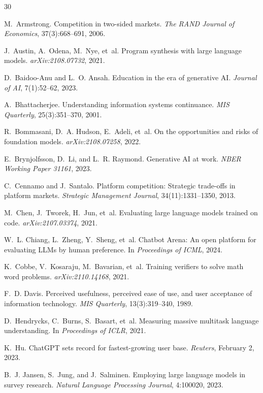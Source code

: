 \documentclass[10pt,twocolumn]{article}
\begin{document}


\begin{thebibliography}{30}
\small

 M.~Armstrong. Competition in two-sided markets. {\em The RAND Journal of Economics}, 37(3):668--691, 2006.

 J.~Austin, A.~Odena, M.~Nye, et~al. Program synthesis with large language models. {\em arXiv:2108.07732}, 2021.

 D.~Baidoo-Anu and L.~O. Ansah. Education in the era of generative {AI}. {\em Journal of AI}, 7(1):52--62, 2023.

 A.~Bhattacherjee. Understanding information systems continuance. {\em MIS Quarterly}, 25(3):351--370, 2001.

 R.~Bommasani, D.~A. Hudson, E.~Adeli, et~al. On the opportunities and risks of foundation models. {\em arXiv:2108.07258}, 2022.

 E.~Brynjolfsson, D.~Li, and L.~R. Raymond. Generative {AI} at work. {\em NBER Working Paper 31161}, 2023.

 C.~Cennamo and J.~Santalo. Platform competition: Strategic trade-offs in platform markets. {\em Strategic Management Journal}, 34(11):1331--1350, 2013.

 M.~Chen, J.~Tworek, H.~Jun, et~al. Evaluating large language models trained on code. {\em arXiv:2107.03374}, 2021.

 W.~L. Chiang, L.~Zheng, Y.~Sheng, et~al. Chatbot {A}rena: An open platform for evaluating {LLM}s by human preference. In {\em Proceedings of ICML}, 2024.

 K.~Cobbe, V.~Kosaraju, M.~Bavarian, et~al. Training verifiers to solve math word problems. {\em arXiv:2110.14168}, 2021.

 F.~D. Davis. Perceived usefulness, perceived ease of use, and user acceptance of information technology. {\em MIS Quarterly}, 13(3):319--340, 1989.

 D.~Hendrycks, C.~Burns, S.~Basart, et~al. Measuring massive multitask language understanding. In {\em Proceedings of ICLR}, 2021.

 K.~Hu. {ChatGPT} sets record for fastest-growing user base. {\em Reuters}, February 2, 2023.

 B.~J. Jansen, S.~Jung, and J.~Salminen. Employing large language models in survey research. {\em Natural Language Processing Journal}, 4:100020, 2023.


\end{thebibliography}
\end{document}
